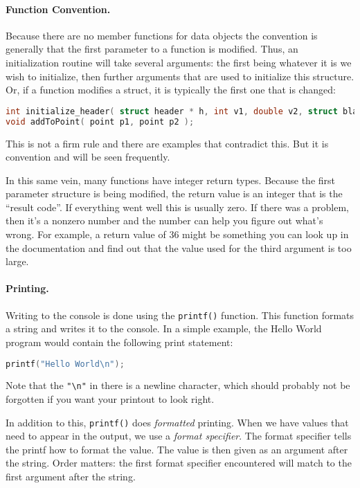 \paragraph{Function Convention.}

Because there are no member functions for data objects the convention is generally that the first parameter to a function is modified. Thus, an initialization routine will take several arguments: the first being whatever it is we wish to initialize, then further arguments that are used to initialize this structure. Or, if a function modifies a struct, it is typically the first one that is changed:

\begin{lstlisting}[language=C]
int initialize_header( struct header * h, int v1, double v2, struct blah * v3 );
void addToPoint( point p1, point p2 );
\end{lstlisting}

This is not a firm rule and there are examples that contradict this. But it is convention and will be seen frequently.

In this same vein, many functions have integer return types. Because the first parameter structure is being modified, the return value is an integer that is the ``result code''. If everything went well this is usually zero. If there was a problem, then it's a nonzero number and the number can help you figure out what's wrong. For example, a return value of 36 might be something you can look up in the documentation and find out that the value used for the third argument is too large. 

\paragraph{Printing.}

Writing to the console is done using the \texttt{printf()} function. This function formats a string and writes it to the console. In a simple example, the Hello World program would contain the following print statement:

\begin{lstlisting}[language=C]
printf("Hello World\n");
\end{lstlisting}

Note that the \texttt{"\textbackslash n"} in there is a newline character, which should probably not be forgotten if you want your printout to look right.

In addition to this, \texttt{printf()} does \textit{formatted} printing. When we have values that need to appear in the output, we use a \textit{format specifier}. The format specifier tells the printf how to format the value. The value is then given as an argument after the string. Order matters: the first format specifier encountered will match to the first argument after the string.

